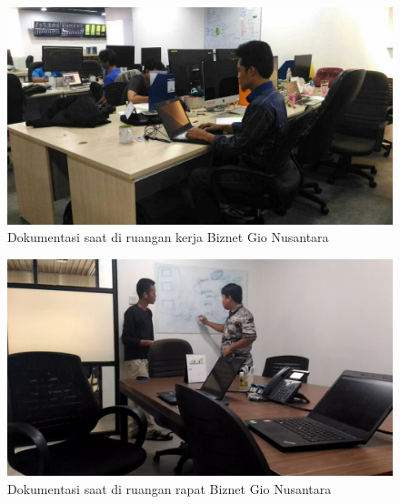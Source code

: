 \begin{figure}[tph]
  \centering
  \includegraphics[width=.9\linewidth]{img/dok2-50p}
  \caption{Dokumentasi saat di ruangan kerja Biznet Gio Nusantara}
\end{figure}

\begin{figure}[tph]
  \centering
  \includegraphics[width=.9\linewidth]{img/dok3-50p}
  \caption{Dokumentasi saat di ruangan rapat Biznet Gio Nusantara}
\end{figure}
